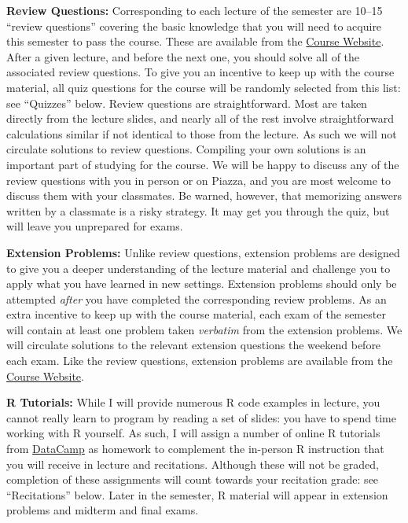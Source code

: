 \documentclass[11pt, letterpaper]{article}
\begin{document}
\medskip
\noindent \textbf{Review Questions:} 
Corresponding to each lecture of the semester are 10--15 ``review questions'' covering the basic knowledge that you will need to acquire this semester to pass the course.
These are available from the \href{http://ditraglia.com/Econ103Public}{Course Website}.
After a given lecture, and before the next one, you should solve all of the associated review questions. 
To give you an incentive to keep up with the course material, all quiz questions for the course will be randomly selected from this list: see ``Quizzes'' below.
Review questions are straightforward.
Most are taken directly from the lecture slides, and nearly all of the rest involve straightforward calculations similar if not identical to those from the lecture.
As such we will not circulate solutions to review questions.
Compiling your own solutions is an important part of studying for the course.
We will be happy to discuss any of the review questions with you in person or on Piazza, and you are most welcome to discuss them with your classmates.
Be warned, however, that memorizing answers written by a classmate is a risky strategy.
It may get you through the quiz, but will leave you unprepared for exams.

\medskip
\noindent \textbf{Extension Problems:} 
Unlike review questions, extension problems are designed to give you a deeper understanding of the lecture material and challenge you to apply what you have learned in new settings.
Extension problems should only be attempted \emph{after} you have completed the corresponding review problems.
As an extra incentive to keep up with the course material, each exam of the semester will contain at least one problem taken \emph{verbatim} from the extension problems.
We will circulate solutions to the relevant extension questions the weekend before each exam.
Like the review questions, extension problems are available from the \href{http://ditraglia.com/Econ103Public}{Course Website}.

\medskip
\noindent \textbf{R Tutorials:}
While I will provide numerous R code examples in lecture, you cannot really learn to program by reading a set of slides: you have to spend time working with R yourself.
As such, I will assign a number of online R tutorials from \href{https://datacamp.com}{DataCamp} as homework to complement the in-person R instruction that you will receive in lecture and recitations.
Although these will not be graded, completion of these assignments will count towards your recitation grade: see ``Recitations'' below.
Later in the semester, R material will appear in extension problems and midterm and final exams.
\end{document}
